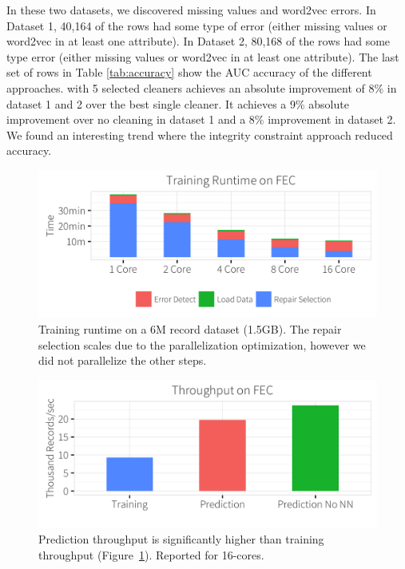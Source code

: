 In these two datasets, we discovered missing values and word2vec errors. 
In Dataset 1, 40,164 of the rows had some type of error (either missing values or word2vec in at least one attribute).
In Dataset 2, 80,168 of the rows had some type error (either missing values or word2vec in at least one attribute).
The last set of rows in Table \ref{tab:accuracy} show the AUC accuracy of the different approaches.
\sys with 5 selected cleaners achieves an absolute improvement of 8\% in dataset 1 and 2 over the best single cleaner.
It achieves a 9\% absolute improvement over no cleaning in dataset 1 and a 8\% improvement in dataset 2.
We found an interesting trend where the integrity constraint approach reduced accuracy.


\begin{figure}[t]
\centering
\includegraphics[width=0.8\columnwidth]{exp/runtime.png}
\caption{Training runtime on a 6M record dataset (1.5GB). The repair selection scales due to the parallelization optimization, however we did not parallelize the other steps.\label{exp:runtime}}
\end{figure}

\begin{figure}[t]
\centering
\includegraphics[width=0.8\columnwidth]{exp/runtime2.png}
\caption{Prediction throughput is significantly higher than training throughput (Figure~\ref{exp:runtime}).  Reported for 16-cores.\label{exp:tp}}
\end{figure}

